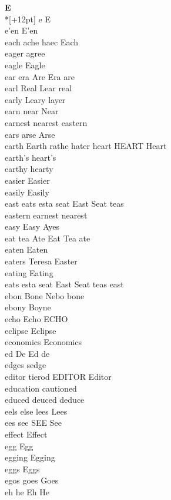 \vspace{14pt}
\noindent\textbf{\Large E}\\*[+12pt]
e E\\
e'en E'en\\
each ache haec Each\\
eager agree\\
eagle Eagle\\
ear era Are Era are\\
earl Real Lear real\\
early Leary layer\\
earn near Near\\
earnest nearest eastern\\
ears arse Arse\\
earth Earth rathe hater heart HEART Heart\\
earth's heart's\\
earthy hearty\\
easier Easier\\
easily Easily\\
east eats esta seat East Seat teas\\
eastern earnest nearest\\
easy Easy Ayes\\
eat tea Ate Eat Tea ate\\
eaten Eaten\\
eaters Teresa Easter\\
eating Eating\\
eats esta seat East Seat teas east\\
ebon Bone Nebo bone\\
ebony Boyne\\
echo Echo ECHO\\
eclipse Eclipse\\
economics Economics\\
ed De Ed de\\
edges sedge\\
editor tierod EDITOR Editor\\
education cautioned\\
educed deuced deduce\\
eels else lees Lees\\
ees see SEE See\\
effect Effect\\
egg Egg\\
egging Egging\\
eggs Eggs\\
egos goes Goes\\
eh he Eh He\\
